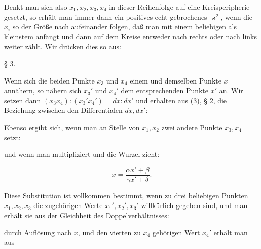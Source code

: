 Denkt man sich also $x_1, x_2, x_3, x_4$ in dieser Reihenfolge auf eine Kreisperipherie gesetzt, so erhält man immer dann ein positives echt gebrochenes $\varkappa^2$, wenn die $x_i$ so der Größe nach aufeinander folgen, daß man mit einem beliebigen als kleinstem anfängt und dann auf dem Kreise entweder nach rechts oder nach links weiter zählt. Wir drücken dies so aus:


§ 3. 

Wenn sich die beiden Punkte $x_3$ und $x_4$ einem und demselben Punkte $x$ annähern, so nähern sich $x_3'$ und $x_4'$ dem entsprechenden Punkte $x'$ an. Wir setzen dann $(x_3x_4):(x_3'x_4') = dx:dx'$ und erhalten aus (3), § 2, die Beziehung zwischen den Differentialen $dx, dx'$:

Ebenso ergibt sich, wenn man an Stelle von $x_1, x_2$ zwei andere Punkte $x_3, x_4$ setzt:

und wenn man multipliziert und die Wurzel zieht:

\[
x = \frac{\alpha x' + \beta}{\gamma x' + \delta}.
\]

Diese Substitution ist vollkommen bestimmt, wenn zu drei beliebigen Punkten $x_1, x_2, x_3$ die zugehörigen Werte $x_1', x_2', x_3'$ willkürlich gegeben sind, und man erhält sie aus der Gleichheit des Doppelverhältnisses:

durch Auflösung nach $x$, und den vierten zu $x_4$ gehörigen Wert $x_4'$ erhält man aus
